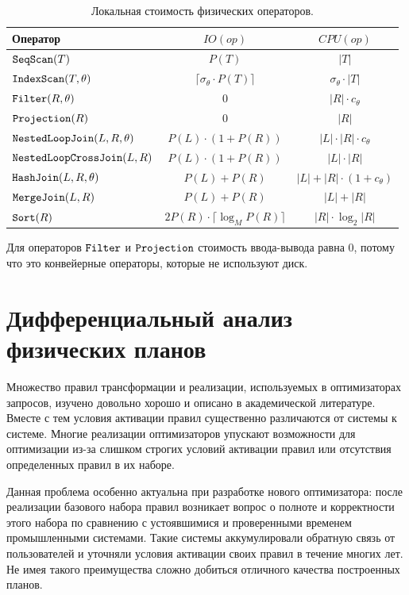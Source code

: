 \documentclass[fontsize=14pt, russian]{scrartcl}
\begin{document}
\begin{longtable}{|l|c|c|}
  \caption{Локальная стоимость физических операторов.}\label{tbl:local-cost}\\
  \hline
  Оператор & \(IO(op)\) & \(CPU(op)\) \\
  \hline
  \endfirsthead
  \hline
  \endfoot

  \(\texttt{SeqScan}(T)\) & \(P(T)\) & \(|T|\) \\ \hline
  \(\texttt{IndexScan}(T, \theta)\) & \(\lceil \sigma_\theta \cdot P(T) \rceil\) & \(\sigma_\theta \cdot |T|\) \\ \hline
  \(\texttt{Filter}(R, \theta)\) & \(0\) & \(|R| \cdot c_\theta\) \\ \hline
  \(\texttt{Projection}(R)\) & \(0\) & \(|R|\) \\ \hline
  \(\texttt{NestedLoopJoin}(L, R, \theta)\) & \(P(L) \cdot (1 + P(R))\) & \(|L| \cdot |R| \cdot c_\theta\) \\ \hline
  \(\texttt{NestedLoopCrossJoin}(L, R)\) & \(P(L) \cdot (1 + P(R))\) & \(|L| \cdot |R|\) \\ \hline
  \(\texttt{HashJoin}(L, R, \theta)\) & \(P(L) + P(R)\) & \(|L| + |R| \cdot (1 + c_\theta)\) \\ \hline
  \(\texttt{MergeJoin}(L, R)\) & \(P(L) + P(R)\) & \(|L| + |R|\) \\ \hline
  \(\texttt{Sort}(R)\) & \(2 P(R) \cdot \lceil \log_M P(R) \rceil\) & \(|R| \cdot \log_2 |R|\)
\end{longtable}

Для операторов \(\texttt{Filter}\) и \(\texttt{Projection}\) стоимость ввода-вывода равна \(0\), потому что это конвейерные операторы, которые не используют диск.

\section{Дифференциальный анализ физических планов}

Множество правил трансформации и реализации, используемых в
оптимизаторах запросов, изучено довольно хорошо и описано в
академической литературе. Вместе с тем условия активации правил
существенно различаются от системы к системе. Многие реализации
оптимизаторов упускают возможности для оптимизации из-за слишком
строгих условий активации правил или отсутствия определенных правил
в их наборе.

Данная проблема особенно актуальна при разработке нового оптимизатора: после
реализации базового набора правил возникает вопрос о полноте и корректности
этого набора по сравнению с устоявшимися и проверенными временем промышленными
системами. Такие системы аккумулировали обратную связь от пользователей и
уточняли условия активации своих правил в течение многих лет. Не имея такого
преимущества сложно добиться отличного качества построенных планов.
\end{document}
